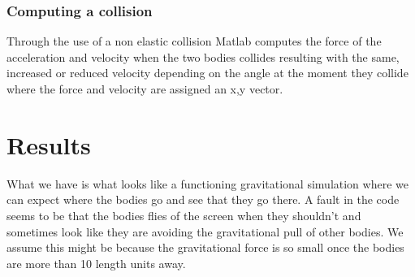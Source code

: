 \documentclass[11pt]{article}
\begin{document}
\subsubsection{Computing a collision}
Through the use of a non elastic collision Matlab computes the force of the acceleration and velocity when the two bodies collides resulting with the same, increased or reduced velocity depending on the angle at the moment they collide where the force and velocity are assigned an x,y vector.

\section{Results}
What we have is what looks like a functioning gravitational simulation where we can expect where the bodies go and see that they go there. A fault in the code seems to be that the bodies flies of the screen when they shouldn't and sometimes look like they are avoiding the gravitational pull of other bodies. We assume this might be because the gravitational force is so small once the bodies are more than 10 length units away.
\end{document}
